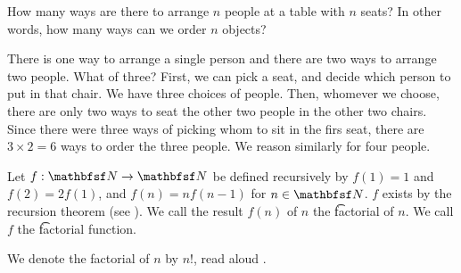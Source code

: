 

How many ways are there to arrange $n$ people at a table with $n$ seats?
In other words, how many ways can we order $n$ objects?


There is one way to arrange a single person and there are two ways to arrange two people.
What of three?
First, we can pick a seat, and decide which person to put in that chair.
We have three choices of people.
Then, whomever we choose, there are only two ways to seat the other two people in the other two chairs.
Since there were three ways of picking whom to sit in the firs seat, there are $3\times 2 = 6$ ways to order the three people.
We reason similarly for four people.


Let $f: \N \to \N$ be defined recursively by $f(1) = 1$ and $f(2) = 2f(1)$, and $f(n) = nf(n-1)$ for $n \in \N$.
$f$ exists by the recursion theorem (see ).
We call the result $f(n)$ of $n$ the \t{factorial} of $n$.
We call $f$ the \t{factorial function}.


We denote the factorial of $n$ by $n!$, read aloud .

\blankpage
